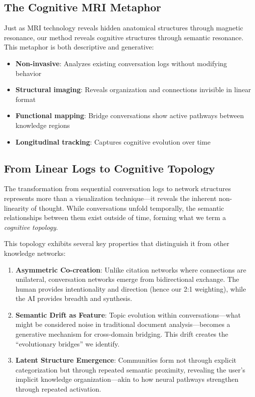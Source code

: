 \documentclass[10pt, a4paper]{article}
\begin{document}
\subsection{The Cognitive MRI Metaphor}
Just as MRI technology reveals hidden anatomical structures through magnetic resonance, our method reveals cognitive structures through semantic resonance. This metaphor is both descriptive and generative:
\begin{itemize}
    \item \textbf{Non-invasive}: Analyzes existing conversation logs without modifying behavior
    \item \textbf{Structural imaging}: Reveals organization and connections invisible in linear format  
    \item \textbf{Functional mapping}: Bridge conversations show active pathways between knowledge regions
    \item \textbf{Longitudinal tracking}: Captures cognitive evolution over time
\end{itemize}

\subsection{From Linear Logs to Cognitive Topology}
The transformation from sequential conversation logs to network structures represents more than a visualization technique—it reveals the inherent non-linearity of thought. While conversations unfold temporally, the semantic relationships between them exist outside of time, forming what we term a \emph{cognitive topology}.

This topology exhibits several key properties that distinguish it from other knowledge networks:
\begin{enumerate}
    \item \textbf{Asymmetric Co-creation}: Unlike citation networks where connections are unilateral, conversation networks emerge from bidirectional exchange. The human provides intentionality and direction (hence our 2:1 weighting), while the AI provides breadth and synthesis.
    
    \item \textbf{Semantic Drift as Feature}: Topic evolution within conversations—what might be considered noise in traditional document analysis—becomes a generative mechanism for cross-domain bridging. This drift creates the ``evolutionary bridges'' we identify.
    
    \item \textbf{Latent Structure Emergence}: Communities form not through explicit categorization but through repeated semantic proximity, revealing the user's implicit knowledge organization—akin to how neural pathways strengthen through repeated activation.
\end{enumerate}
\end{document}
